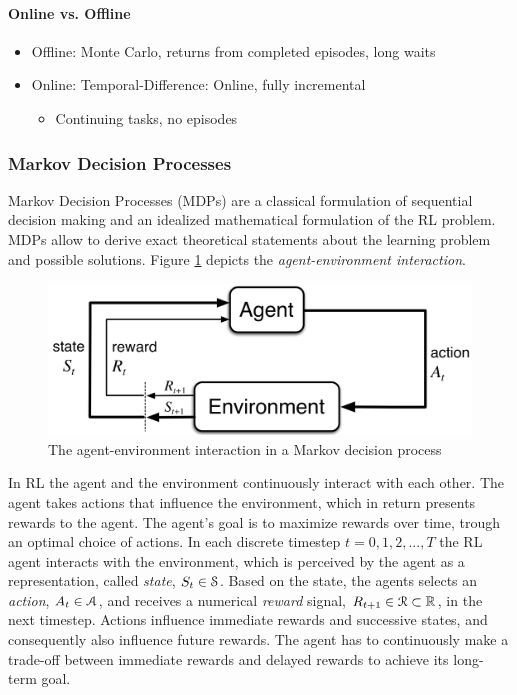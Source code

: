\documentclass[a4paper, twoside, 12pt]{article}
\let\cite\shortcite
\begin{document}
\paragraph{Online vs. Offline}
\label{sec:orgcfb4133}
\begin{itemize}
\item Offline: Monte Carlo, returns from completed episodes, long waits
\item Online: Temporal-Difference: Online, fully incremental
\begin{itemize}
\item Continuing tasks, no episodes
\end{itemize}
\end{itemize}

\subsubsection{Markov Decision Processes}
\label{sec:orgb805cbe}
Markov Decision Processes (MDPs) are a classical formulation of sequential
decision making and an idealized mathematical formulation of the RL problem. MDPs
allow to derive exact theoretical statements about the learning problem and
possible solutions. Figure
\ref{agent-environment-interaction} depicts the \emph{agent-environment interaction}.
\begin{figure}[htbp]
\centering
\includegraphics[width=.9\linewidth]{./fig/mdp_interaction.png}
\caption[Markov Decision Process]{The agent-environment interaction in a Markov decision process \cite{sutton18_reinf} \label{agent-environment-interaction}}
\end{figure}
In RL the agent and the environment continuously interact with each other. The
agent takes actions that influence the environment, which in return presents
rewards to the agent. The agent's goal is to maximize rewards over time, trough
an optimal choice of actions. In each discrete timestep \(t\!=\!0,1,2,...,T\) the
RL agent interacts with the environment, which is perceived by the agent as a
representation, called \emph{state}, \(S_t \in \S\). Based on the state, the agents
selects an \emph{action}, \(A_t\in\A\), and receives a numerical \emph{reward} signal,
\(R_{t+1}\in\R\subset\Re\), in the next timestep. Actions influence immediate
rewards and successive states, and consequently also influence future rewards.
The agent has to continuously make a trade-off between immediate rewards and
delayed rewards to achieve its long-term goal.
\end{document}

